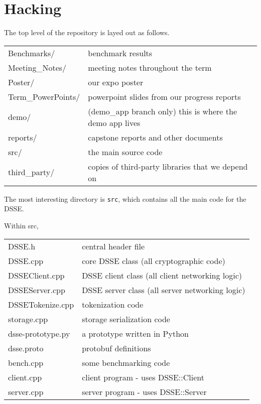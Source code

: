 \section{Hacking}

The top level of the repository is layed out as follows.

\begin{center}
\begin{tabular}{ll}
    Benchmarks/         & benchmark results \\
    Meeting\_Notes/      & meeting notes throughout the term \\
    Poster/             & our expo poster \\
    Term\_PowerPoints/   & powerpoint slides from our progress reports \\
    demo/               & (demo\_app branch only) this is where the demo app lives \\
    reports/            & capstone reports and other documents \\
    src/                & the main source code \\
    third\_party/        & copies of third-party libraries that we depend on \\
\end{tabular}
\end{center}

The most interesting directory is \texttt{src}, which contains all the main code for the DSSE.


Within src,

\begin{center}
\begin{tabular}{ll}
    DSSE.h                      & central header file \\
    DSSE.cpp                    & core DSSE class (all cryptographic code) \\
    DSSEClient.cpp              & DSSE client class  (all client networking logic) \\
    DSSEServer.cpp              & DSSE server class  (all server networking logic) \\
    DSSETokenize.cpp            & tokenization code \\
    storage.cpp                 & storage serialization code \\
    \hline
    dsse-prototype.py           & a prototype written in Python \\
    dsse.proto                  & protobuf definitions \\
    \hline
    bench.cpp                   & some benchmarking code \\
    client.cpp                  & client program - uses DSSE::Client \\
    server.cpp                  & server program - uses DSSE::Server \\
\end{tabular}
\end{center}


